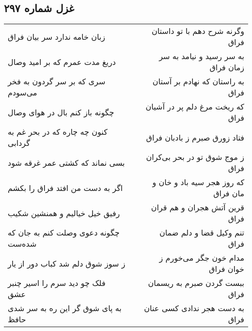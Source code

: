 \begin{center}
\section*{غزل شماره ۲۹۷}
\label{sec:sh297}
\begin{longtable}{l p{0.5cm} r}
زبان خامه ندارد سر بیان فراق
&&
وگرنه شرح دهم با تو داستان فراق
\\
دریغ مدت عمرم که بر امید وصال
&&
به سر رسید و نیامد به سر زمان فراق
\\
سری که بر سر گردون به فخر می‌سودم
&&
به راستان که نهادم بر آستان فراق
\\
چگونه باز کنم بال در هوای وصال
&&
که ریخت مرغ دلم پر در آشیان فراق
\\
کنون چه چاره که در بحر غم به گردابی
&&
فتاد زورق صبرم ز بادبان فراق
\\
بسی نماند که کشتی عمر غرقه شود
&&
ز موج شوق تو در بحر بی‌کران فراق
\\
اگر به دست من افتد فراق را بکشم
&&
که روز هجر سیه باد و خان و مان فراق
\\
رفیق خیل خیالیم و همنشین شکیب
&&
قرین آتش هجران و هم قران فراق
\\
چگونه دعوی وصلت کنم به جان که شده‌ست
&&
تنم وکیل قضا و دلم ضمان فراق
\\
ز سوز شوق دلم شد کباب دور از یار
&&
مدام خون جگر می‌خورم ز خوان فراق
\\
فلک چو دید سرم را اسیر چنبر عشق
&&
ببست گردن صبرم به ریسمان فراق
\\
به پای شوق گر این ره به سر شدی حافظ
&&
به دست هجر ندادی کسی عنان فراق
\\
\end{longtable}
\end{center}
